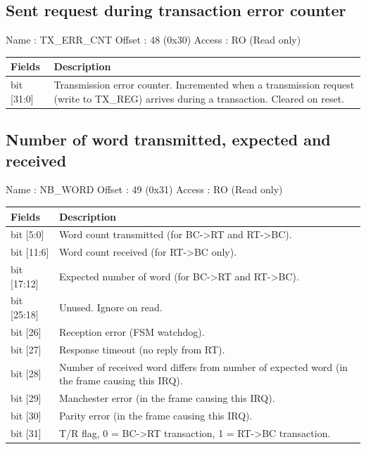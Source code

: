 \documentclass[11pt,a4paper]{article}
\begin{document}
\subsection{Sent request during transaction error counter}

Name   : TX\_ERR\_CNT \newline
Offset : 48 (0x30) \newline
Access : RO (Read only) \newline

\begin{table}[h!]
  \begin{tabularx}{\textwidth}{ l X }
    \hline
    \textbf{Fields} & \textbf{Description}\\
    \hline
    bit [31:0]  & Transmission error counter. Incremented when a transmission request (write to TX\_REG) arrives during a transaction. Cleared on reset. \\
    \hline
  \end{tabularx}
\end{table}

\subsection{Number of word transmitted, expected and received}

Name   : NB\_WORD \newline
Offset : 49 (0x31) \newline
Access : RO (Read only) \newline

\begin{table}[h!]
  \begin{tabularx}{\textwidth}{ l X }
    \hline
    \textbf{Fields} & \textbf{Description}\\
    \hline
    bit [5:0]   & Word count transmitted (for BC->RT and RT->BC). \\
    bit [11:6]  & Word count received (for RT->BC only). \\
    bit [17:12] & Expected number of word (for BC->RT and RT->BC). \\
    bit [25:18] & Unused. Ignore on read. \\
    bit [26]    & Reception error (FSM watchdog). \\
    bit [27]    & Response timeout (no reply from RT). \\
    bit [28]    & Number of received word differs from number of expected word (in the frame causing this IRQ). \\
    bit [29]    & Manchester error (in the frame causing this IRQ). \\
    bit [30]    & Parity error (in the frame causing this IRQ). \\
    bit [31]    & T/R flag, 0 = BC->RT transaction, 1 = RT->BC transaction. \\
    \hline
  \end{tabularx}
\end{table}
\end{document}

